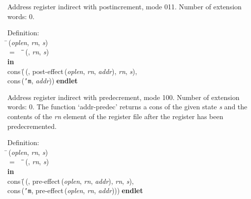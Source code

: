  Address register indirect with postincrement, mode 011.
 Number of extension words: 0.
\begin{tabbing}{\sc Definition}: \\  
\=\,({\it{oplen\/}}, {\it{rn\/}}, {\it{s\/}}) \\ 
$=$$\;\;\;\;$\=\=\,({}, {\it{rn\/}}, {\it{s\/}})\- \\ 
{\bf in} \\ 
{\rm{cons}}\,(\=\,({}, {\rm{post-effect}}\,({\it{oplen\/}}, {\it{rn\/}}, {\it{addr\/}}), {\it{rn\/}}, {\it{s\/}}), \\ 
{\rm{cons}}\,({\tt{'}}{\tt{m}}, {\it{addr\/}}))\-$\;${\bf  endlet}\-\-
\end{tabbing}

 Address register indirect with predecrement, mode 100.
 Number of extension words: 0.
 The function `addr-predec' returns a cons of the given state {\it{s\/}} and
 the contents of the {\it{rn\/}} element of the register file after
 the register has been predecremented.
\begin{tabbing}{\sc Definition}: \\  
\=\,({\it{oplen\/}}, {\it{rn\/}}, {\it{s\/}}) \\ 
$=$$\;\;\;\;$\=\=\,({}, {\it{rn\/}}, {\it{s\/}})\- \\ 
{\bf in} \\ 
{\rm{cons}}\,(\=\,({}, {\rm{pre-effect}}\,({\it{oplen\/}}, {\it{rn\/}}, {\it{addr\/}}), {\it{rn\/}}, {\it{s\/}}), \\ 
{\rm{cons}}\,({\tt{'}}{\tt{m}}, {\rm{pre-effect}}\,({\it{oplen\/}}, {\it{rn\/}}, {\it{addr\/}})))\-$\;${\bf  endlet}\-\-
\end{tabbing}

